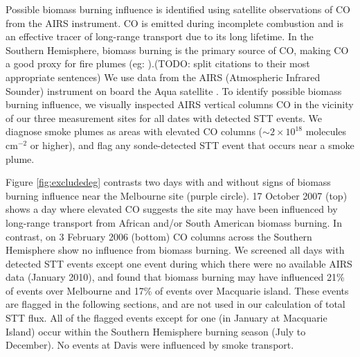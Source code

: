\documentclass{article}
\begin{document}
    
    Possible biomass burning influence is identified using satellite observations of CO from the AIRS instrument.
    CO is emitted during incomplete combustion and is an effective tracer of long-range transport due to its long lifetime.
    In the Southern Hemisphere, biomass burning is the primary source of CO, making CO a good proxy for fire plumes (eg: \citet{Edwards2003,Sinha2004,Edwards2006,Mari2008}).(TODO: split citations to their most appropriate sentences)
    We use data from the AIRS (Atmospheric Infrared Sounder) instrument on board the Aqua satellite \citep{AIRS3STD}.
    To identify possible biomass burning influence, we visually inspected AIRS vertical columns CO in the vicinity of our three measurement sites for all dates with detected STT events.
    We diagnose smoke plumes as areas with elevated CO columns ($\sim 2 \times 10^{18}$ molecules cm$^{-2}$ or higher), and flag any sonde-detected STT event that occurs near a smoke plume.

    Figure \ref{fig:excludedeg} contrasts two days with and without signs of biomass burning influence near the Melbourne site (purple circle).
    17 October 2007 (top) shows a day where elevated CO suggests the site may have been influenced by long-range transport from African and/or South American biomass burning.
    In contrast, on 3 February 2006 (bottom) CO columns across the Southern Hemisphere show no influence from biomass burning.
    We screened all days with detected STT events except one event during which there were no available AIRS data (January 2010), and found that biomass burning may have influenced 21\% of events over Melbourne and 17\% of events over Macquarie island.
    These events are flagged in the following sections, and are not used in our calculation of total STT flux.
    All of the flagged events except for one (in January at Macquarie Island) occur within the Southern Hemisphere burning season (July to December).%
    No events at Davis were influenced by smoke transport.
    
\end{document}
